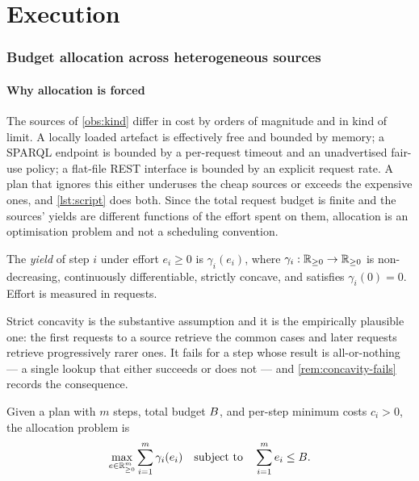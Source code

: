 \part{Execution}

\section{Budget allocation across heterogeneous sources}
\label{sec:allocation}

\subsection{Why allocation is forced}

The sources of \cref{obs:kind} differ in cost by orders of magnitude and in
kind of limit. A locally loaded artefact is effectively free and bounded by
memory; a SPARQL endpoint is bounded by a per-request timeout and an
unadvertised fair-use policy; a flat-file REST interface is bounded by an
explicit request rate. A plan that ignores this either underuses the cheap
sources or exceeds the expensive ones, and \cref{lst:script} does both. Since
the total request budget is finite and the sources' yields are different
functions of the effort spent on them, allocation is an optimisation problem
and not a scheduling convention.

\begin{definition}[Yield]
\label{def:yield}
The \emph{yield} of step $i$ under effort $e_i \geq 0$ is
$\gamma_i(e_i)$, where $\gamma_i : \mathbb{R}_{\geq 0} \to \mathbb{R}_{\geq 0}$ is
non-decreasing, continuously differentiable, strictly concave, and satisfies
$\gamma_i(0) = 0$. Effort is measured in requests.
\end{definition}

Strict concavity is the substantive assumption and it is the empirically
plausible one: the first requests to a source retrieve the common cases and
later requests retrieve progressively rarer ones. It fails for a step whose
result is all-or-nothing --- a single lookup that either succeeds or does not
--- and \cref{rem:concavity-fails} records the consequence.

\begin{definition}
\label{def:alloc}
Given a plan with $m$ steps, total budget $B$, and per-step minimum costs
$c_i > 0$, the allocation problem is
\[
\max_{e \in \mathbb{R}^m_{\geq 0}} \sum_{i=1}^{m} \gamma_i(e_i)
\quad\text{subject to}\quad
\sum_{i=1}^{m} e_i \leq B .
\]
\end{definition}

